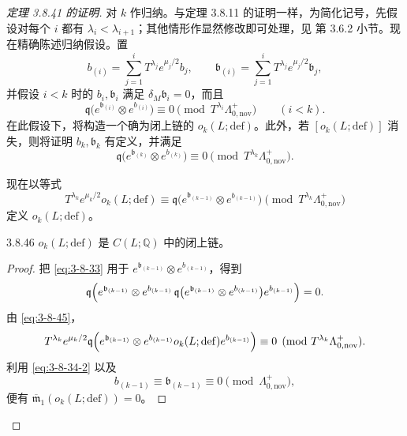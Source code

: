 \begin{proof}[定理 3.8.41 的证明]
对 $k$ 作归纳。与定理 3.8.11 的证明一样，为简化记号，先假设对每个
$i$ 都有 $\lambda_i<\lambda_{i+1}$；其他情形作显然修改即可处理，见
第 3.6.2 小节。现在精确陈述归纳假设。置
\[
 b_{(i)}
 =\sum_{j=1}^{i}T^{\lambda_j}e^{\mu_j/2}b_j,
 \qquad
 \mathfrak b_{(i)}
 =\sum_{j=1}^{i}T^{\lambda_j}e^{\mu_j/2}\mathfrak b_j,
\]
并假设 $i<k$ 时的 $b_i,\mathfrak b_i$ 满足
$\delta_M\mathfrak b_i=0$，而且
\begin{equation}
 \mathfrak q\bigl(
 e^{\mathfrak b_{(i)}}\otimes e^{b_{(i)}}
 \bigr)
 \equiv0
 \pmod{T^{\lambda_i}\Lambda^+_{0,\mathrm{nov}}}
 \qquad(i<k).
\tag{3.8.44}\label{eq:3-8-44}
\end{equation}
在此假设下，将构造一个确为闭上链的
$o_k(L;\mathrm{def})$。此外，若
$[o_k(L;\mathrm{def})]$ 消失，则将证明
$b_k,\mathfrak b_k$ 有定义，并满足
\[
 \mathfrak q\bigl(
 e^{\mathfrak b_{(k)}}\otimes e^{b_{(k)}}
 \bigr)
 \equiv0
 \pmod{T^{\lambda_k}\Lambda^+_{0,\mathrm{nov}}}.
\]

现在以等式
\begin{equation}
 T^{\lambda_k}e^{\mu_k/2}o_k(L;\mathrm{def})
 \equiv
 \mathfrak q\bigl(
 e^{\mathfrak b_{(k-1)}}\otimes e^{b_{(k-1)}}
 \bigr)
 \pmod{T^{\lambda_k}\Lambda^+_{0,\mathrm{nov}}}
\tag{3.8.45}\label{eq:3-8-45}
\end{equation}
定义 $o_k(L;\mathrm{def})$。

\begin{lemma}{3.8.46}\label{lem:3-8-46}
$o_k(L;\mathrm{def})$ 是 $C(L;\mathbb Q)$ 中的闭上链。
\end{lemma}

\begin{proof}
把 \eqref{eq:3-8-33} 用于
$e^{\mathfrak b_{(k-1)}}\otimes e^{b_{(k-1)}}$，得到
\[
\begin{aligned}
 \mathfrak q\Bigl(
 e^{\mathfrak b_{(k-1)}}\otimes
 e^{b_{(k-1)}}\,
 \mathfrak q\bigl(
  e^{\mathfrak b_{(k-1)}}\otimes e^{b_{(k-1)}}
 \bigr)
 e^{b_{(k-1)}}
 \Bigr)=0.
\end{aligned}
\]
由 \eqref{eq:3-8-45}，
\[
\begin{aligned}
T^{\lambda_k}e^{\mu_k/2}
\mathfrak q\Bigl(
 e^{\mathfrak b_{(k-1)}}\otimes
 e^{b_{(k-1)}}o_k(L;\mathrm{def})e^{b_{(k-1)}}
\Bigr)
\equiv0
\pmod{T^{\lambda_k}\Lambda^+_{0,\mathrm{nov}}}.
\end{aligned}
\]
利用 \eqref{eq:3-8-34-2} 以及
\[
 b_{(k-1)}\equiv\mathfrak b_{(k-1)}
 \equiv0\pmod{\Lambda^+_{0,\mathrm{nov}}},
\]
便有
$\overline{\mathfrak m}_1(o_k(L;\mathrm{def}))=0$。
\end{proof}


\end{proof}
